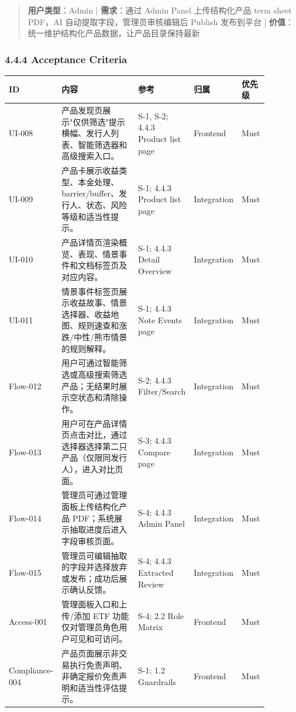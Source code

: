 \begin{quote}\small \textbf{用户类型}：Admin | \textbf{需求}：通过 Admin Panel 上传结构化产品 term sheet PDF，AI 自动提取字段，管理员审核编辑后 Publish 发布到平台 | \textbf{价值}：统一维护结构化产品数据，让产品目录保持最新\end{quote}


\subsubsection{4.4.4 Acceptance Criteria}

\begingroup
\small
\begin{longtable}{L{0.18\linewidth}L{0.30\linewidth}L{0.18\linewidth}L{0.12\linewidth}L{0.10\linewidth}}
\toprule
\textbf{ID} & \textbf{内容} & \textbf{参考} & \textbf{归属} & \textbf{优先级} \\
\midrule
UI-008 & 产品发现页展示"仅供筛选"提示横幅、发行人列表、智能筛选器和高级搜索入口。 & S-1, S-2; 4.4.3 Product list page & Frontend & Must \\
UI-009 & 产品卡展示收益类型、本金处理、 barrier/buffer、发行人、状态、风险等级和适当性提示。 & S-1; 4.4.3 Product list page & Integration & Must \\
UI-010 & 产品详情页渲染概览、表现、情景事件和文档标签页及对应内容。 & S-1; 4.4.3 Detail Overview & Integration & Must \\
UI-011 & 情景事件标签页展示收益故事、情景选择器、收益地图、规则速查和涨跌/中性/熊市情景的规则解释。 & S-1; 4.4.3 Note Events page & Integration & Must \\
Flow-012 & 用户可通过智能筛选或高级搜索筛选产品；无结果时展示空状态和清除操作。 & S-2; 4.4.3 Filter/Search & Integration & Must \\
Flow-013 & 用户可在产品详情页点击对比，通过选择器选择第二只产品（仅限同发行人），进入对比页面。 & S-3; 4.4.3 Compare page & Integration & Must \\
Flow-014 & 管理员可通过管理面板上传结构化产品 PDF；系统展示抽取进度后进入字段审核页面。 & S-4; 4.4.3 Admin Panel & Integration & Must \\
Flow-015 & 管理员可编辑抽取的字段并选择放弃或发布；成功后展示确认反馈。 & S-4; 4.4.3 Extracted Review & Integration & Must \\
Access-001 & 管理面板入口和上传/添加 ETF 功能仅对管理员角色用户可见和可访问。 & S-4; 2.2 Role Matrix & Frontend & Must \\
Compliance-004 & 产品页面展示非交易执行免责声明、非确定报价免责声明和适当性评估提示。 & S-1; 1.2 Guardrails & Frontend & Must \\
\bottomrule
\end{longtable}
\endgroup

